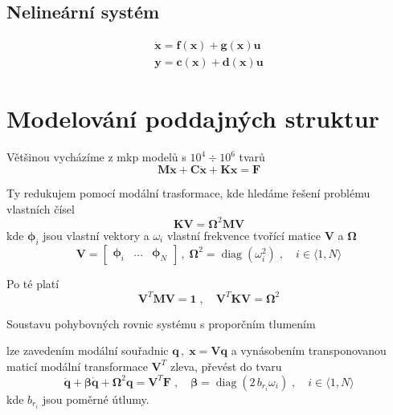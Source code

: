 \documentclass{article}
\begin{document}
	\subsection*{Nelineární systém}
	\begin{align}
		\bm{\dot{x}} = \bm{f}(\bm{x}) + \bm{g}(\bm{x})\bm{u} \\
		\bm{y} = \bm{c}(\bm{x}) + \bm{d}(\bm{x}) \bm{u}
	\end{align}
	
	\section{Modelování poddajných struktur}
	Většinou vycházíme z mkp modelů s $10^4 \div 10^6$ tvarů
	\begin{equation*}
		\bm{M}\bm{\ddot{x}} + \bm{C}\bm{\dot{x}} + \bm{K}\bm{x} = \bm{F}
	\end{equation*}

	Ty redukujem pomocí modální trasformace, kde hledáme řešení problému vlastních čísel
	\begin{equation*}
		\bm{K}\bm{V} = \bm{\Omega}^2 \bm{M} \bm{V}
	\end{equation*}
	kde $\bm{\phi}_i$ jsou vlastní vektory a $\omega_i$ vlastní frekvence tvořící matice $\bm{V}$ a $\bm{\Omega}$  
	\begin{equation*}
		\bm{V} = \begin{bmatrix} \bm{\phi}_i & \dots & \bm{\phi}_N \end{bmatrix}
		\,,\;
		\bm{\Omega}^2 = \operatorname{diag}(\omega_i^2)
		\;,\quad 
		i \in \langle 1,N \rangle
	\end{equation*}

	Po té platí
	\begin{equation*}
		\bm{V}^T\bm{M}\bm{V} = \bm{1}
		\;,\quad 
		\bm{V}^T\bm{K}\bm{V} = \bm{\Omega}^2
	\end{equation*}

	Soustavu pohybovných rovnic systému s proporčním tlumením

	lze zavedením modální souřadnic $\bm{q} \,,\; \bm{x} = \bm{V}\bm{q}$ a vynásobením transponovanou maticí modální transformace $\bm{V}^T$ zleva, převést do tvaru
	\begin{equation*}
		\bm{\ddot{q}} + \bm{\beta}\bm{\dot{q}} + \bm{\Omega}^2 \bm{q} = \bm{V}^T \bm{F}
		\;,\quad 
		\bm{\beta} = \operatorname{diag}(2\,b_{r_i}\omega_i) \;,\quad i \in \langle 1,N \rangle
	\end{equation*}
	kde $ b_{r_i}$ jsou poměrné útlumy.
\end{document}
